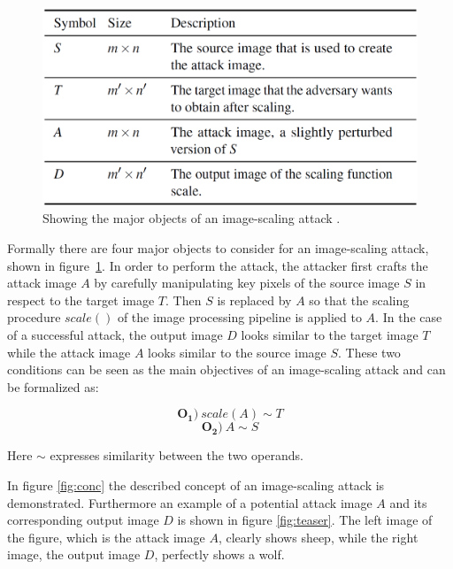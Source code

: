 \documentclass[sigconf]{acmart}
\begin{document}
\begin{figure}[h]
  \centering
  \includegraphics[width=\linewidth]{img/table_attack_symbols.png}
  \caption{Showing the major objects of an image-scaling attack \cite{imgscale}.}
  \Description{}
  \label{fig:table}
\end{figure}

Formally there are four major objects to consider for an image-scaling attack, shown in figure~\ref{fig:table}.
In order to perform the attack, the attacker first crafts the attack image $A$ by carefully manipulating key pixels of the source image $S$ in respect to the target image $T$.
Then $S$ is replaced by $A$ so that the scaling procedure $scale()$ of the image processing pipeline is applied to $A$.
In the case of a successful attack, the output image $D$ looks similar to the target image $T$ while the attack image $A$ looks similar to the source image $S$.
These two conditions can be seen as the main objectives of an image-scaling attack and can be formalized as:

\begin{equation}
\label{eq:O1}
\boldsymbol{O_1})~scale(A) \sim T
\end{equation}
\begin{equation}
\label{eq:O2}
\boldsymbol{O_2})~A \sim S
\end{equation}

Here $\sim$ expresses similarity between the two operands.

In figure \ref{fig:conc} the described concept of an image-scaling attack is demonstrated.
Furthermore an example of a potential attack image $A$ and its corresponding output image $D$ is shown in figure \ref{fig:teaser}.
The left image of the figure, which is the attack image $A$, clearly shows sheep, while the right image, the output image $D$, perfectly shows a wolf.
\end{document}
